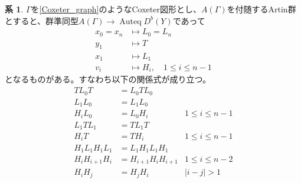\documentclass[uplatex, a4paper, dvipdfmx]{jsarticle}
\theoremstyle{definition}
\newtheorem{corollary}[theorem]{系}
\DeclareMathOperator{\Auteq}{\mathrm{Auteq}}
\begin{document}
\begin{corollary}\label{Artin_relation_cor}
    $\Gamma$を\eqref{Coxeter_graph}のようなCoxeter図形とし、$A(\Gamma)$を付随するArtin群とすると、群準同型$A(\Gamma) \to \Auteq D^b(Y)$であって
    \begin{align}
        x_0 = x_n & \mapsto L_0 = L_n                   \\
        y_1       & \mapsto T                           \\
        x_1       & \mapsto L_1                         \\
        v_i       & \mapsto H_i, \quad 1\leq i \leq n-1
    \end{align}
    となるものがある。すなわち以下の関係式が成り立つ。
    \begin{align}
        TL_0T         & = L_0TL_0 \label{eq:1}                                      \\
        L_1L_0        & = L_1L_0 \label{eq:2}                                       \\
        H_iL_0        & = L_0H_i                    & 1\leq i \leq n-1 \label{eq:3} \\
        L_1TL_1       & = TL_1T \label{eq:4}                                        \\
        H_iT          & = TH_i                      & 1\leq i \leq n-1 \label{eq:5} \\
        H_1L_1H_1L_1  & = L_1H_1L_1H_1 \label{eq:6}                                 \\
        H_iH_{i+1}H_i & = H_{i+1}H_iH_{i+1}         & 1\leq i \leq n-2 \label{eq:7} \\
        H_iH_j        & = H_jH_i                    & |i-j|>1\label{eq:8}
    \end{align}
\end{corollary}
\end{document}
